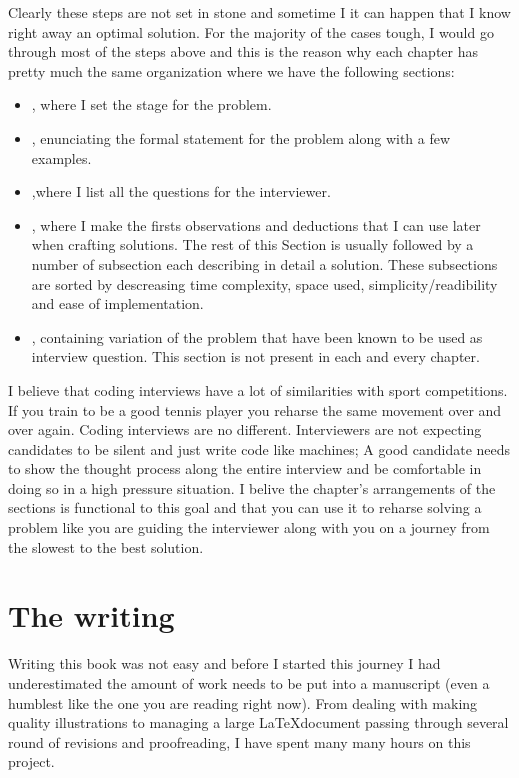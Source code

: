 Clearly these steps are not set in stone and sometime I it can happen that I know right away an optimal solution. 
For the majority of the cases tough, I would go through most of the steps above and this is the reason why each chapter has pretty much the same organization where we have the following sections:
\begin{itemize}
    \item \textit{}, where I set the stage for the problem.
    \item \textit{}, enunciating the formal statement for the problem along with a few examples.
    \item \textit{},where I list all the questions for the interviewer. 
    \item \textit{}, where I make the firsts observations and deductions that I can use later when crafting solutions. The rest of this Section is usually followed by a number of subsection each describing in detail a solution. These subsections are sorted by descreasing time complexity, space used, simplicity/readibility and ease of implementation. 
    \item \textit{}, containing variation of the problem that have been known to be used as interview question. This section is not present in each and every chapter.
 \end{itemize}

I believe that coding interviews have a lot of similarities with sport competitions. If you train to be a good tennis player you reharse the same movement over and over again. Coding interviews are no different. 
Interviewers are not expecting candidates to be silent and just write code like machines; 
A good candidate needs to show the thought process along the entire interview and be comfortable in doing so in a high pressure situation. 
I belive the chapter's arrangements of the sections is functional to this goal and that you can use it to reharse solving a problem like you are guiding the interviewer along with you on a journey from the slowest to the best solution. 


\section*{The writing}
Writing this book was not easy and before I started this journey I had underestimated the amount of work needs to be put into a manuscript (even a humblest like the one you are reading right now). 
From dealing with making quality illustrations to managing a large \LaTeX document passing through several round of revisions and proofreading, I have spent many many hours on this project. 

